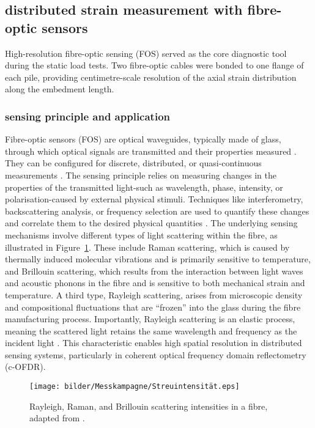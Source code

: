 {\subsection{distributed strain measurement with fibre-optic sensors}
\label{subsec:fos_measurement}

High-resolution fibre-optic sensing (FOS) served as the core diagnostic tool during the static load tests.
Two fibre-optic cables were bonded to one flange of each pile, providing centimetre-scale resolution of the axial strain distribution along the embedment length.

\subsubsection{sensing principle and application}

Fibre-optic sensors (FOS) are optical waveguides, typically made of glass, through which optical signals are transmitted and their properties measured \parencite{weisbrich2021}. They can be configured for discrete, distributed, or quasi-continuous measurements \parencite{Kunzel.2016}. The sensing principle relies on measuring changes in the properties of the transmitted light-such as wavelength, phase, intensity, or polarisation-caused by external physical stimuli. Techniques like interferometry, backscattering analysis, or frequency selection are used to quantify these changes and correlate them to the desired physical quantities \parencite{Kunzel.2016}.
The underlying sensing mechanisms involve different types of light scattering within the fibre, as illustrated in Figure~\ref{fig:scattering_intensity}. These include Raman scattering, which is caused by thermally induced molecular vibrations and is primarily sensitive to temperature, and Brillouin scattering, which results from the interaction between light waves and acoustic phonons in the fibre and is sensitive to both mechanical strain and temperature. A third type, Rayleigh scattering, arises from microscopic density and compositional fluctuations that are ``frozen'' into the glass during the fibre manufacturing process. Importantly, Rayleigh scattering is an elastic process, meaning the scattered light retains the same wavelength and frequency as the incident light \parencite{Kunzel.2016}. This characteristic enables high spatial resolution in distributed sensing systems, particularly in coherent optical frequency domain reflectometry (c-OFDR).


\begin{figure}[!htb]
	\centering
	\texttt{[image: bilder/Messkampagne/Streuintensität.eps]}
	\caption[Rayleigh, Raman and Brillouin scattering intensities in a fibre.]{Rayleigh, Raman, and Brillouin scattering intensities in a fibre, adapted from \textcite{Kunzel.2016}.}
	\label{fig:scattering_intensity}
\end{figure}

}
